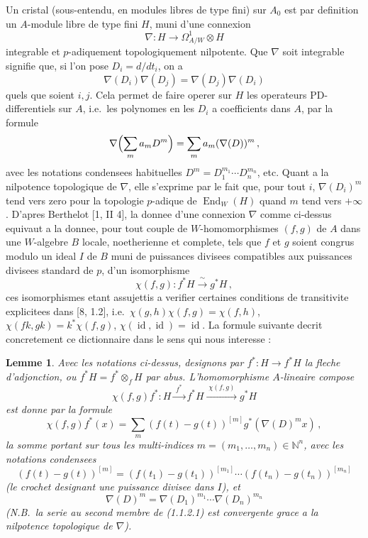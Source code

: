 \documentclass[12pt,a4paper]{article}
\theoremstyle{plain}
\newtheorem{lemma}[theorem]{Lemme}
\theoremstyle{definition}
\theoremstyle{remark}
\DeclareMathOperator{\End}{End}
\DeclareMathOperator{\id}{id}
\begin{document}
Un cristal (sous-entendu, en modules libres de type fini) sur $A_0$ est par definition un $A$-module libre de type fini $H$, muni d'une connexion
\[
\nabla : H \longrightarrow \Omega^1_{A/W} \otimes H
\]
integrable et $p$-adiquement topologiquement nilpotente. Que $\nabla$ soit integrable signifie que, si l'on pose $D_i = d/dt_i$, on a
\[
\nabla(D_i)\nabla(D_j) = \nabla(D_j)\nabla(D_i)
\]
quels que soient $i,j$. Cela permet de faire operer sur $H$ les operateurs PD-differentiels sur $A$, i.e.\ les polynomes en les $D_i$ a coefficients dans $A$, par la formule
\[
\nabla\Bigl(\sum_m a_m D^m\Bigr) = \sum_m a_m (\nabla(D))^m\,,
\]
avec les notations condensees habituelles $D^m = D_1^{m_1} \cdots D_n^{m_n}$, etc. Quant a la nilpotence topologique de $\nabla$, elle s'exprime par le fait que, pour tout $i$, $\nabla(D_i)^m$ tend vers zero pour la topologie $p$-adique de $\End_W(H)$ quand $m$ tend vers $+\infty$. D'apres Berthelot [1, II 4], la donnee d'une connexion $\nabla$ comme ci-dessus equivaut a la donnee, pour tout couple de $W$-homomorphismes $(f,g)$ de $A$ dans une $W$-algebre $B$ locale, noetherienne et complete, tels que $f$ et $g$ soient congrus modulo un ideal $I$ de $B$ muni de puissances divisees compatibles aux puissances divisees standard de $p$, d'un isomorphisme
\begin{equation}
\chi(f,g) : f^*H \xrightarrow{\;\sim\;} g^*H\,,\tag{$*$}
\end{equation}
ces isomorphismes etant assujettis a verifier certaines conditions de transitivite explicitees dans [8, 1.2], i.e.\ $\chi(g,h)\chi(f,g) = \chi(f,h)$, $\chi(fk,gk) = k^*\chi(f,g)$, $\chi(\id,\id) = \id$. La formule suivante decrit concretement ce dictionnaire dans le sens qui nous interesse :

\begin{lemma}\label{lem:1.1.2}
Avec les notations ci-dessus, designons par $f^* : H \to f^*H$ la fleche d'adjonction, ou $f^*H = f^* \otimes_f H$ par abus. L'homomorphisme $A$-lineaire compose
\[
\chi(f,g)f^* : H \xrightarrow{\;f^*\;} f^*H \xrightarrow{\;\chi(f,g)\;} g^*H
\]
est donne par la formule
\begin{equation}\label{eq:1.1.2.1}
\chi(f,g)f^*(x) = \sum_m (f(t)-g(t))^{[m]} g^*(\nabla(D)^m x)\,,
\end{equation}
la somme portant sur tous les multi-indices $m = (m_1, \ldots, m_n) \in \mathbb{N}^n$, avec les notations condensees
\[
(f(t)-g(t))^{[m]} = (f(t_1)-g(t_1))^{[m_1]} \cdots (f(t_n)-g(t_n))^{[m_n]}
\]
(le crochet designant une puissance divisee dans $I$), et
\[
\nabla(D)^m = \nabla(D_1)^{m_1} \cdots \nabla(D_n)^{m_n}
\]
\emph{(N.B.\ la serie au second membre de (1.1.2.1) est convergente grace a la nilpotence topologique de $\nabla$).}
\end{lemma}
\end{document}
